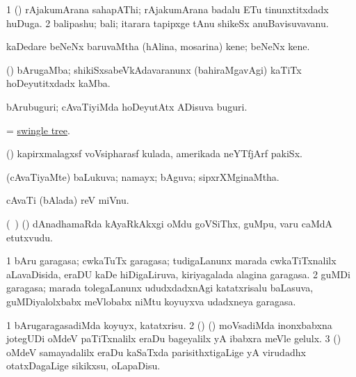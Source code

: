 \bentry
{} 
\gl{\nA}
\expl{}
\bmng
\bnum
\num{1} (\ca) rAjakumArana sahapAThi; rAjakumArana badalu ETu tinunxtitxdadx huDuga. 
\num{2} balipashu; bali; itarara tapipxge tAnu shikeSx anuBavisuvavanu. 
\enum
\emng
\eentry

\bentry
{} 
\gl{\nA}
\expl{}
\bmng
kaDedare beNeNx baruvaMtha (hAlina, mosarina) kene; beNeNx kene. 
\emng
\eentry

\bentry
{} 
\gl{\nA}
\expl{}
\bmng
(\ca) bArugaMba; shikiSxsabeVkAdavaranunx (bahiraMgavAgi) kaTiTx hoDeyutitxdadx kaMba. 
\emng
\eentry

\bentry
{} 
\gl{\nA}
\expl{}
\bmng
bArubuguri; cAvaTiyiMda hoDeyutAtx ADisuva buguri. 
\emng
\eentry

\bentry
{} 
\gl{\nA}
\expl{}
\bmng
= \hyperref{kandict_s.pdf}{S}{swingle tree}{swingle tree}. 
\emng
\eentry

\bentry
{} 
\gl{\nA}
\expl{}
\bmng
(\ame) kapirxmalagxsf voVsipharasf kulada, amerikada neYTfjArf pakiSx. 
\emng
\eentry

\bentry
{} 
\gl{\gu}
\bmng
(cAvaTiyaMte) baLukuva; namayx; bAguva; sipxrXMginaMtha. 
\emng
\eentry

\bentry
{} 
\gl{\nA}
\expl{}
\bmng
cAvaTi (bAlada) reV miVnu. 
\emng
\eentry

\bentry
{} 
\gl{\nA}
\expl{}
\bmng
(\kanmu\ \birx) (\AmA) dAnadhamaRda kAyaRkAkxgi oMdu goVSiThx, guMpu, \mo varu caMdA etutxvudu. 
\emng
\eentry

\bentry
{} 
\gl{\nA}
\expl{}
\bmng
\bnum
\num{1} bAru garagasa; cwkaTuTx garagasa; tudigaLanunx marada cwkaTiTxnalilx aLavaDisida, eraDU kaDe hiDigaLiruva, kiriyagalada alagina garagasa. 
\num{2} guMDi garagasa; marada tolegaLanunx ududxdadxnAgi katatxrisalu baLasuva, guMDiyalolxbabx meVlobabx niMtu koyuyxva udadxneya garagasa. 
\enum
\emng
\eentry

\bentry
{} 
\gl{\kirx}


\noindent
\gl{\sakirx}
\expl{}
\bmng
\bnum
\num{1} bArugaragasadiMda koyuyx, katatxrisu. 
\num{2} (\ame) (\ashi) moVsadiMda inonxbabxna jotegUDi oMdeV paTiTxnalilx eraDu bageyalilx yA ibabxra meVle gelulx. 
\num{3} (\AmA) oMdeV samayadalilx eraDu kaSaTxda parisithxtigaLige yA virudadhx otatxDagaLige sikikxsu, oLapaDisu. 
\enum
\emng

